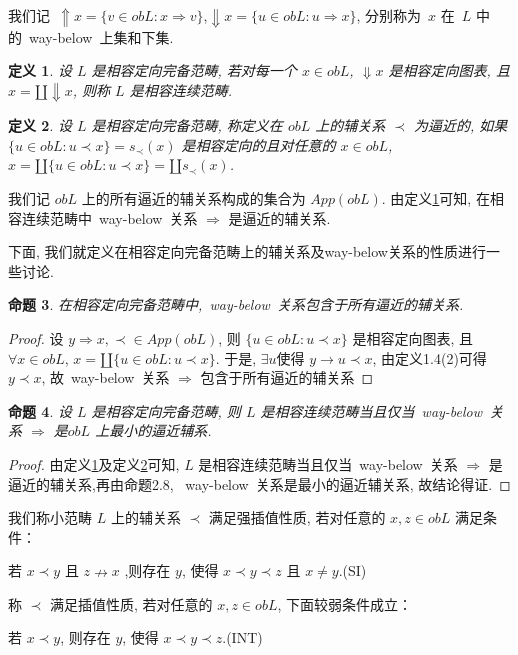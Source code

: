 \documentclass[c5size,a4paper,hyperref,fancyhdr,UTF8]{ctexart}
\theoremstyle{nonumberplain}
\newtheorem{proof}{证明}
\newtheorem{definition}{定义}[section]
\newtheorem{proposition}[definition]{命题}
\theoremstyle{nonumberplain}
\newtheorem{proof}{证}
\begin{document}
我们记~$\Uparrow x=\{v\in obL:x\Rightarrow v\}$,$\Downarrow x=\{u\in obL:u\Rightarrow x\}$, 分别称为~$x$ 在~$L$ 中的~way-below~上集和下集.

\begin{definition}\label{def:2.6}
  设 $L$ 是相容定向完备范畴, 若对每一个 $x\in obL$, $\Downarrow x$ 是相容定向图表, 且 $x=\amalg\Downarrow x$, 则称 $L$ 是相容连续范畴.
\end{definition}

\begin{definition}\label{def:2.7}
  设 $L$ 是相容定向完备范畴, 称定义在 $obL$ 上的辅关系 $\prec$ 为逼近的, 如果 $\{u\in obL:u\prec x\}=s_{\prec}(x)$ 是相容定向的且对任意的 $x\in obL$, $x=\amalg\{u\in obL:u\prec x\}=\amalg s_{\prec}(x)$.
\end{definition}

我们记 $obL$ 上的所有逼近的辅关系构成的集合为 $App(obL)$. 由定义\ref{def:2.6}可知, 在相容连续范畴中~way-below~关系 $\Rightarrow$ 是逼近的辅关系.\vspace{0.2cm}

下面, 我们就定义在相容定向完备范畴上的辅关系及way-below关系的性质进行一些讨论.

\begin{proposition}
  在相容定向完备范畴中,~way-below~关系包含于所有逼近的辅关系.
\end{proposition}

\begin{proof}
  设 $y\Rightarrow x ,\prec\in App(obL)$, 则 $\{u\in obL:u\prec x\}$ 是相容定向图表, 且 $\forall x\in obL$, $x=\amalg\{u\in obL:u\prec x\}$. 于是, $\exists u$使得 $y\rightarrow u\prec x$, 由定义1.4(2)可得~$y\prec x$, 故~way-below~关系 $\Rightarrow$ 包含于所有逼近的辅关系
\end{proof}

\begin{proposition}\label{prop:2.9}
  设 $L$ 是相容定向完备范畴, 则 $L$ 是相容连续范畴当且仅当~way-below~关系 $\Rightarrow$ 是$obL$ 上最小的逼近辅系.
\end{proposition}

\begin{proof}
  由定义\ref{def:2.6}及定义\ref{def:2.7}可知, $L$ 是相容连续范畴当且仅当~way-below~关系 $\Rightarrow$ 是逼近的辅关系,再由命题2.8, ~way-below~关系是最小的逼近辅关系, 故结论得证.
\end{proof}

我们称小范畴 $L$ 上的辅关系 $\prec$ 满足强插值性质, 若对任意的 $x,z\in obL$ 满足条件：
\begin{center}
  若 $x\prec y$ 且 $z\nrightarrow x$ ,则存在 $y$, 使得 $x\prec y\prec z$ 且 $x\neq y$.(SI)
\end{center}
称 $\prec$ 满足插值性质, 若对任意的 $x,z\in obL$, 下面较弱条件成立：
\begin{center}
  若 $x\prec y$, 则存在 $y$, 使得 $x\prec y\prec z$.(INT)
\end{center}
\end{document}
